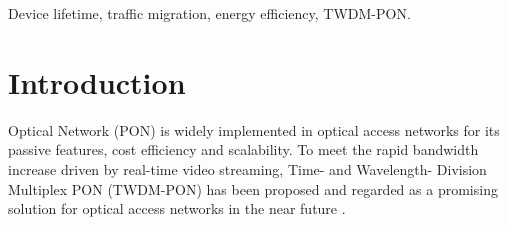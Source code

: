 \documentclass[letter]{IEEEtran}
\begin{document}
\begin{IEEEkeywords}
Device lifetime, traffic migration, energy efficiency, TWDM-PON.
\end{IEEEkeywords}






%
\IEEEpeerreviewmaketitle

\vspace{-4.0mm}

\section{Introduction}
% 
% 
% 
% 
 Optical Network (PON) is widely implemented in optical access networks for its passive features, cost efficiency and scalability. To meet the rapid bandwidth increase driven by real-time video streaming, Time- and Wavelength- Division Multiplex PON (TWDM-PON) has been proposed and regarded as a promising solution for optical access networks in the near future \cite{6289432}.
\end{document}
